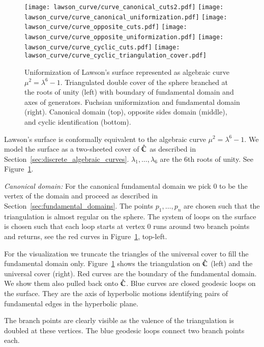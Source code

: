 \documentclass[Thesis.tex]{subfiles}
\begin{document}
  \begin{figure}
  	\centering
  	\resizebox{!}{6cm} {
  	\texttt{[image: lawson\_curve/curve\_canonical\_cuts2.pdf]}
  	\texttt{[image: lawson\_curve/curve\_canonical\_uniformization.pdf]}
  	}
  	\resizebox{!}{6cm} {
  	\texttt{[image: lawson\_curve/curve\_opposite\_cuts.pdf]}
  	\texttt{[image: lawson\_curve/curve\_opposite\_uniformization.pdf]}
  	}
  	\resizebox{!}{6cm} {
  	\texttt{[image: lawson\_curve/curve\_cyclic\_cuts.pdf]}
  	\texttt{[image: lawson\_curve/curve\_cyclic\_triangulation\_cover.pdf]}
  	}
  	\caption{Uniformization of Lawson's surface represented as algebraic curve $\mu^2=\lambda^6-1$. Triangulated double cover of the sphere branched at the roots of unity (left) with boundary of fundamental domain and axes of generators. Fuchsian uniformization and fundamental domain (right). Canonical domain (top), opposite sides domain (middle), and cyclic identification (bottom).}
  	\label{fig:lawson_curve}
  \end{figure}

  Lawson's surface is conformally equivalent to the algebraic curve $\mu^2=\lambda^6-1$.
  We model the surface as a two-sheeted cover of $\hat {\mathbb C}$ as described in Section~\ref{sec:discrete_algebraic_curves}. $\lambda_1,\ldots,\lambda_6$ are the 6th roots of unity.
  See Figure~\ref{fig:lawson_curve}.

  \textit{Canonical domain:}
  For the canonical fundamental domain we pick $0$ to be the vertex of the domain and proceed as described in Section~\ref{sec:fundamental_domains}.
  The points $p_1,\ldots,p_n$ are chosen such that the triangulation is almost regular on the sphere.
  The system of loops on the surface is chosen such that each loop starts at vertex $0$ runs around two branch points and returns, see the red curves in Figure~\ref{fig:lawson_curve}, top-left.

  For the visualization we truncate the triangles of the universal cover to fill the fundamental domain only.
  Figure~\ref{fig:lawson_curve} shows the triangulation on $\hat {\mathbb C}$ (left) and the universal cover (right).
  Red curves are the boundary of the fundamental domain.
  We show them also pulled back onto $\hat {\mathbb C}$. Blue curves are closed geodesic loops on the surface.
  They are the axis of hyperbolic motions identifying pairs of fundamental edges in the hyperbolic plane.

  The branch points are clearly visible as the valence of the triangulation is doubled at these vertices.
  The blue geodesic loops connect two branch points each.
\end{document}

